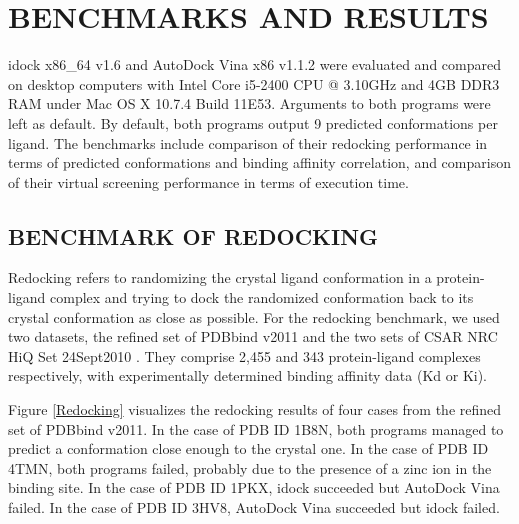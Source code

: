 \documentclass[12pt]{article}
\begin{document}
\section*{\sffamily \Large BENCHMARKS AND RESULTS}

idock x86\_64 v1.6 and AutoDock Vina x86 v1.1.2 were evaluated and compared on desktop computers with Intel Core i5-2400 CPU @ 3.10GHz and 4GB DDR3 RAM under Mac OS X 10.7.4 Build 11E53. Arguments to both programs were left as default. By default, both programs output 9 predicted conformations per ligand. The benchmarks include comparison of their redocking performance in terms of predicted conformations and binding affinity correlation, and comparison of their virtual screening performance in terms of execution time.

\subsection*{\sffamily \large BENCHMARK OF REDOCKING}

Redocking refers to randomizing the crystal ligand conformation in a protein-ligand complex and trying to dock the randomized conformation back to its crystal conformation as close as possible. For the redocking benchmark, we used two datasets, the refined set of PDBbind v2011 \citep{529,530} and the two sets of CSAR NRC HiQ Set 24Sept2010 \citep{857,960}. They comprise 2,455 and 343 protein-ligand complexes respectively, with experimentally determined binding affinity data (Kd or Ki).

Figure \ref{Redocking} visualizes the redocking results of four cases from the refined set of PDBbind v2011. In the case of PDB ID 1B8N, both programs managed to predict a conformation close enough to the crystal one. In the case of PDB ID 4TMN, both programs failed, probably due to the presence of a zinc ion in the binding site. In the case of PDB ID 1PKX, idock succeeded but AutoDock Vina failed. In the case of PDB ID 3HV8, AutoDock Vina succeeded but idock failed.
\end{document}

